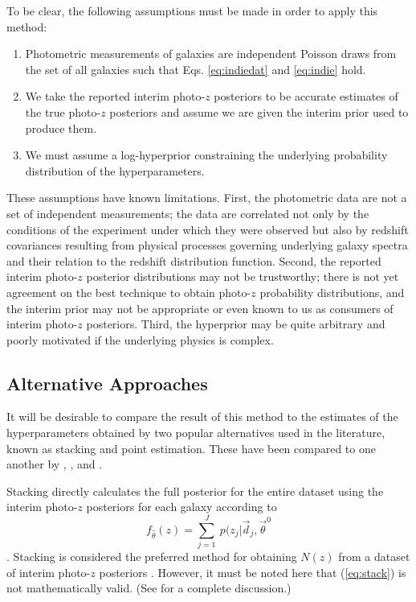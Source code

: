 \documentclass[preprint]{aastex}
\begin{document}
To be clear, the following assumptions must be made in order to apply this 
method:

\begin{enumerate}
\item Photometric measurements of galaxies are independent Poisson draws from 
the set of all galaxies such that Eqs. \ref{eq:indiedat} and \ref{eq:indie} 
hold.
\item We take the reported interim photo-$z$ posteriors to be accurate 
estimates of the true photo-$z$ posteriors and assume we are given the interim 
prior used to produce them.
\item We must assume a log-hyperprior constraining the underlying probability 
distribution of the hyperparameters.
\end{enumerate}

These assumptions have known limitations.  First, the photometric data are not 
a set of independent measurements; the data are correlated not only by the 
conditions of the experiment under which they were observed but also by 
redshift covariances resulting from physical processes governing underlying 
galaxy spectra and their relation to the redshift distribution function.  
Second, the reported interim photo-$z$ posterior distributions may not be 
trustworthy; there is not yet agreement on the best technique to obtain 
photo-$z$ probability distributions, and the interim prior may not be 
appropriate or even known to us as consumers of interim photo-$z$ posteriors.  
Third, the hyperprior may be quite arbitrary and poorly motivated if the 
underlying physics is complex.

\subsection{Alternative Approaches}
\label{sec:sheldon}

It will be desirable to compare the result of this method to the estimates of 
the hyperparameters obtained by two popular alternatives used in the 
literature, known as stacking and point estimation.   These have been compared 
to one another by \citet{Hildebrandt2012}, \citet{Benjamin2013}, and 
\citet{Asorey2016}.

Stacking directly calculates the full posterior for the entire dataset using 
the interim photo-$z$ posteriors for each galaxy according to 
\begin{equation}
\label{eq:stack}
f_{\hat{\theta}}(z) = \sum_{j=1}^{J}\ p(z_{j}|\vec{d}_{j},\vec{\theta}^{0}
\end{equation}
\citep{Lima2008}.  Stacking is considered the preferred method for obtaining 
$N(z)$ from a dataset of interim photo-$z$ posteriors \citep{Sheldon2012, 
Kelly2014, Benjamin2013, Bonnett2015a, Viironen2015, Asorey2016}.  However, it 
must be noted here that (\ref{eq:stack}) is not mathematically valid.  (See 
\citet{Hogg2012} for a complete discussion.)  
\end{document}
